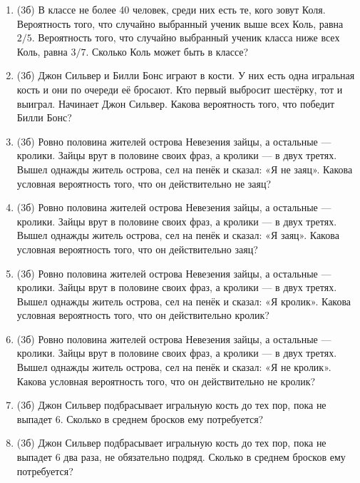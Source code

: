 \documentclass[a4paper, 12pt]{article}
\begin{document}
\newpage
\begin{enumerate}[resume]
\item (3б) В классе не более 40 человек, среди них есть те, кого зовут Коля. Вероятность того, что случайно выбранный ученик выше всех Коль, равна $2/5$. Вероятность того, что случайно выбранный ученик класса ниже всех Коль, равна $3/7$. Сколько Коль может быть в классе?
\item (3б) Джон Сильвер и Билли Бонс играют в кости. У них есть одна игральная кость и они по очереди её бросают. Кто первый выбросит шестёрку, тот и выиграл. Начинает Джон Сильвер. Какова вероятность того, что победит Билли Бонс?
\item (3б) Ровно половина жителей острова Невезения зайцы, а остальные — кролики. Зайцы врут в половине своих фраз, а кролики — в двух третях. Вышел однажды житель острова, сел на пенёк и сказал: «Я не заяц». Какова условная вероятность того, что он действительно не заяц?
\item (3б) Ровно половина жителей острова Невезения зайцы, а остальные — кролики. Зайцы врут в половине своих фраз, а кролики — в двух третях. Вышел однажды житель острова, сел на пенёк и сказал: «Я заяц». Какова условная вероятность того, что он действительно заяц?
\item (3б) Ровно половина жителей острова Невезения зайцы, а остальные — кролики. Зайцы врут в половине своих фраз, а кролики — в двух третях. Вышел однажды житель острова, сел на пенёк и сказал: «Я кролик». Какова условная вероятность того, что он действительно кролик?
\item (3б) Ровно половина жителей острова Невезения зайцы, а остальные — кролики. Зайцы врут в половине своих фраз, а кролики — в двух третях. Вышел однажды житель острова, сел на пенёк и сказал: «Я не кролик». Какова условная вероятность того, что он действительно не кролик?
\item (3б) Джон Сильвер подбрасывает игральную кость до тех пор, пока не выпадет 6. Сколько в среднем бросков ему потребуется?
\item (3б) Джон Сильвер подбрасывает игральную кость до тех пор, пока не выпадет 6 два раза, не обязательно подряд. Сколько в среднем бросков ему потребуется?

\end{enumerate}
\end{document}
